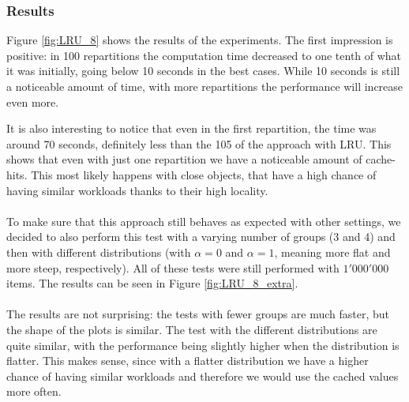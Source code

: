 \subsubsection{Results}
Figure \ref{fig:LRU_8} shows the results of the experiments. The first impression is positive: in 100 repartitions the computation time decreased to one tenth of what it was initially, going below 10 seconds in the best cases. While 10 seconds is still a noticeable amount of time, with more repartitions the performance will increase even more. 

It is also interesting to notice that even in the first repartition, the time was around 70 seconds, definitely less than the 105 of the approach with LRU. This shows that even with just one repartition we have a noticeable amount of cache-hits. This most likely happens with close objects, that have a high chance of having similar workloads thanks to their high locality.
\\\\
To make sure that this approach still behaves as expected with other settings, we decided to also perform this test with a varying number of groups (3 and 4) and then with different distributions (with $\alpha =0$ and $\alpha =1$, meaning more flat and more steep, respectively). All of these tests were still performed with $1'000'000$ items. The results can be seen in Figure \ref{fig:LRU_8_extra}.
\\\\
The results are not surprising: the tests with fewer groups are much faster, but the shape of the plots is similar. The test with the different distributions are quite similar, with the performance being slightly higher when the distribution is flatter. This makes sense, since with a flatter distribution we have a higher chance of having similar workloads and therefore we would use the cached values more often.

